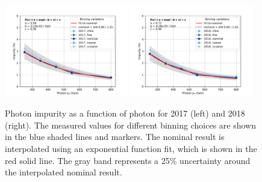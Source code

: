 \begin{figure}[htbp]
    \centering
        \includegraphics[width=0.48\textwidth]{PhotonPurity/purity_variations_2017.pdf}
        \includegraphics[width=0.48\textwidth]{PhotonPurity/purity_variations_2018.pdf}
    \caption{Photon impurity as a function of photon \pt for 2017 (left) and 2018 (right). The measured values for different binning choices 
    are shown in the blue shaded lines and markers. The nominal result is interpolated using an exponential function fit, which is shown in 
    the red solid line. The gray band represents a 25\% uncertainty around the interpolated nominal result.}
    \label{fig:purity_result}
\end{figure}

